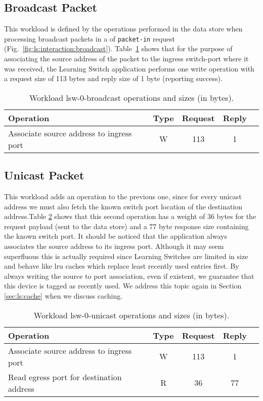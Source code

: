 \documentclass[12pt,openright,twoside]{report}
\begin{document}
\subsection{Broadcast Packet}
This workload is defined by  the operations performed in the data store when processing broadcast packets in a \acrfull{of} \texttt{packet-in} request (Fig.~\ref{fig:ls:interaction:broadcast}). Table~\ref{table:lsw0:broadcast} shows that for the purpose of associating the source address of the packet to the ingress switch-port where it was received, the Learning Switch application performs one write operation with a request size of 113 bytes and reply size of 1 byte (reporting success). 

\begin{table}[ht]
\small
\centering 
\begin{tabular}{l c c c c}
 Operation & Type & Request & Reply \\ \toprule 
 Associate source address to ingress port & W & 113 & 1 \\ 
\end{tabular}
\caption[Workload lsw-0-broadcast operations]{Workload lsw-0-broadcast operations and sizes (in bytes).}
\label{table:lsw0:broadcast}
\end{table}

\subsection{Unicast Packet}
This workload adds an operation to the previous one, since for every unicast address we must also fetch the known switch port location of the destination address.Table \ref{table:lsw0:unicast} shows that this second operation has a weight of 36 bytes for the request payload (sent to the data store) and a 77 byte response size containing the known switch port.  
It should be noticed that the application always associates the source address to its ingress port. Although it may seem superfluous this is actually required since Learning Switches are limited in size and behave like \gls{lru} caches which replace least recently used entries first. By always writing the source to port association, even if existent, we guarantee that this device is tagged as recently used. We address 
this topic again in Section \ref{sec:ls:cache} when we discuss caching. 

\begin{table}[ht]
\small
\centering 
\begin{tabular}{l c c c c}
 Operation & Type & Request & Reply  \\ \toprule 
Associate source address to ingress port & W & 113 & 1\\
Read egress port for destination address & R & 36 & 77 \\
\end{tabular}
\caption[Workload lsw-0-unicast operations]{Workload lsw-0-unicast operations and sizes (in bytes).}
\label{table:lsw0:unicast}
\end{table}
\end{document}
